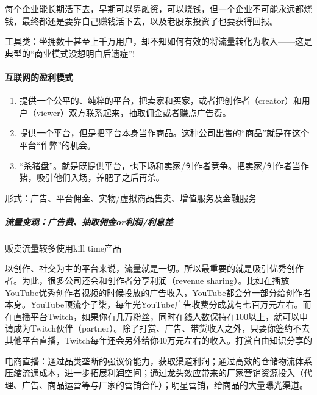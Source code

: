 \documentclass[letterpaper,11pt,english]{sphinxmanual}
\begin{document}
每个企业能长期活下去，早期可以靠融资，可以烧钱，但一个企业不可能永远都烧钱，最终都还是要靠自己赚钱活下去，以及老股东投资了也要获得回报。

工具类：坐拥数十甚至上千万用户，却不知如何有效的将流量转化为收入——这是典型的“商业模式没想明白后遗症”!


\paragraph{互联网的盈利模式}
\label{\detokenize{chapter_introduction/money:id9}}
%
\begin{footnote}[111]\sphinxAtStartFootnote
{}
%
\end{footnote}
\begin{enumerate}
%
\item {} 
提供一个公平的、纯粹的平台，把卖家和买家，或者把创作者（creator）和用户（viewer）双方联系起来，抽取佣金或者赚点广告费。

\item {} 
提供一个平台，但是把平台本身当作商品。这种公司出售的“商品”就是在这个平台“作弊”的机会。

\item {} 
“杀猪盘”。就是既提供平台，也下场和卖家/创作者竞争。把卖家/创作者当作猪，吸引他们入场，养肥了之后再杀。

\end{enumerate}

形式：广告、平台佣金、实物/虚拟商品售卖、增值服务及金融服务


\subparagraph{流量变现：广告费、抽取佣金or利润/利息差}
\label{\detokenize{chapter_introduction/money:or}}
贩卖流量较多使用kill time产品

以创作、社交为主的平台来说，流量就是一切。所以最重要的就是吸引优秀创作者。为此，很多公司还会和创作者分享利润（revenue
sharing）。比如在播放YouTube优秀创作者视频的时候投放的广告收入，YouTube都会分一部分给创作者本身。YouTube顶流李子柒，每年光YouTube广告收费分成就有七百万元左右。而在直播平台Twitch，如果你有几万粉丝，同时在线人数保持在100以上，就可以申请成为Twitch伙伴（partner）。除了打赏、广告、带货收入之外，只要你签约不去其他平台直播，Twitch每年还会另外给你40万元左右的收入。打赏自由知识分享的

电商直播：通过品类垄断的强议价能力，获取渠道利润；通过高效的仓储物流体系压缩流通成本，进一步拓展利润空间；通过龙头效应带来的厂家营销资源投入（代理、广告、商品运营等与厂家的营销合作）；明星营销，给商品的大量曝光渠道。
\end{document}
